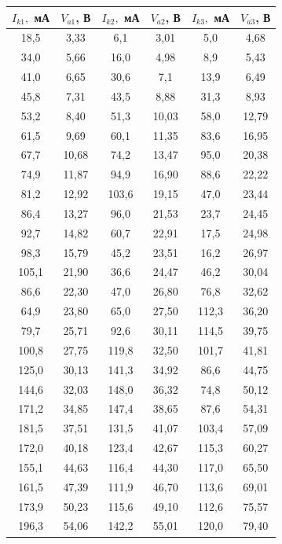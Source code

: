 \documentclass[a4paper, 12pt]{article}%
\begin{document}
\begin{enumerate}
\begin{longtable}{|c|c|c|c|c|c|}
	\hline
	$I_{k1},$ мА & $V_{a1}$, В & $I_{k2},$ мА & $V_{a2}$, В & $I_{k3},$ мА & $V_{a3}$, В  \\ \hline
	18,5 & 3,33 & 6,1 & 3,01 & 5,0 & 4,68 \\ \hline
	34,0 & 5,66 & 16,0 & 4,98 & 8,9 & 5,43 \\ \hline
	41,0 & 6,65 & 30,6 & 7,1 & 13,9 & 6,49 \\ \hline 
	45,8 & 7,31 & 43,5 & 8,88 & 31,3 & 8,93 \\ \hline 
	53,2 & 8,40 & 51,3 & 10,03 & 58,0 & 12,79 \\ \hline
	61,5 & 9,69 & 60,1 & 11,35 & 83,6 & 16,95 \\ \hline
	67,7 & 10,68 & 74,2 & 13,47 & 95,0 & 20,38 \\ \hline
	74,9 & 11,87 & 94,9 & 16,90 & 88,6 & 22,22 \\ \hline
	81,2 & 12,92 & 103,6 & 19,15 & 47,0 & 23,44 \\ \hline
	86,4 & 13,27 & 96,0 & 21,53 & 23,7 & 24,45 \\ \hline
	92,7 & 14,82 & 60,7 & 22,91 & 17,5 & 24,98 \\ \hline
	98,3 & 15,79 & 45,2 & 23,51 & 16,2 & 26,97 \\ \hline
	105,1 & 21,90 & 36,6 & 24,47 & 46,2 & 30,04 \\ \hline
	86,6 & 22,30 & 47,0 & 26,80 & 76,8 & 32,62 \\ \hline
	64,9 & 23,80 & 65,0 & 27,50 & 112,3 & 36,20 \\ \hline
	79,7 & 25,71 & 92,6 & 30,11 & 114,5 & 39,75 \\ \hline
	100,8 & 27,75 & 119,8 & 32,50 & 101,7 & 41,81 \\ \hline
	125,0 & 30,13 & 141,3 & 34,92 & 86,6 & 44,75 \\ \hline
	144,6 & 32,03 & 148,0 & 36,32 & 74,8 & 50,12 \\ \hline
	171,2 & 34,85 & 147,4 & 38,65 & 87,6 & 54,31 \\ \hline
	181,5 & 37,51 & 131,5 & 41,07 & 103,4 & 57,09 \\ \hline
	172,0 & 40,18 & 123,4 & 42,67 & 115,3 & 60,27 \\ \hline
	155,1 & 44,63 & 116,4 & 44,30 & 117,0 & 65,50 \\ \hline
	161,5 & 47,39 & 111,9 & 46,70 & 113,6 & 69,01 \\ \hline
	173,9 & 50,23 & 115,6 & 49,10 & 112,6 & 75,57 \\ \hline
	196,3 & 54,06 & 142,2 & 55,01 & 120,0 & 79,40 \\ \hline

\end{longtable}
\end{enumerate}
\end{document}
